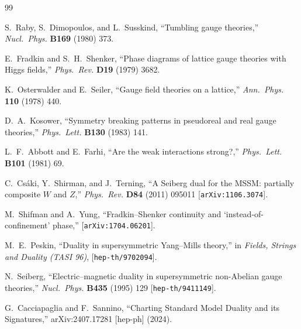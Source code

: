 \documentclass[11pt,a4paper]{article}
\begin{document}
\begin{thebibliography}{99}

  S.~Raby, S.~Dimopoulos, and L.~Susskind,
  ``Tumbling gauge theories,''
  \textit{Nucl.~Phys.} \textbf{B169} (1980) 373.

  E.~Fradkin and S.~H.~Shenker,
  ``Phase diagrams of lattice gauge theories with Higgs fields,''
  \textit{Phys.~Rev.} \textbf{D19} (1979) 3682.

  K.~Osterwalder and E.~Seiler,
  ``Gauge field theories on a lattice,''
  \textit{Ann.~Phys.} \textbf{110} (1978) 440.

  D.~A.~Kosower,
  ``Symmetry breaking patterns in pseudoreal and real gauge theories,''
  \textit{Phys.~Lett.} \textbf{B130} (1983) 141.

  L.~F.~Abbott and E.~Farhi,
  ``Are the weak interactions strong?,''
  \textit{Phys.~Lett.} \textbf{B101} (1981) 69.

  C.~Cs\'aki, Y.~Shirman, and J.~Terning,
  ``A Seiberg dual for the MSSM: partially composite $W$ and $Z$,''
  \textit{Phys.~Rev.} \textbf{D84} (2011) 095011
  [\texttt{arXiv:1106.3074}].

  M.~Shifman and A.~Yung,
  ``Fradkin--Shenker continuity and `instead-of-confinement' phase,''
  [\texttt{arXiv:1704.06201}].

  M.~E.~Peskin,
  ``Duality in supersymmetric Yang--Mills theory,''
  in \textit{Fields, Strings and Duality (TASI 96)},
  [\texttt{hep-th/9702094}].

  N.~Seiberg,
  ``Electric--magnetic duality in supersymmetric non-Abelian gauge
  theories,''
  \textit{Nucl.~Phys.} \textbf{B435} (1995) 129
  [\texttt{hep-th/9411149}].

  G.~Cacciapaglia and F.~Sannino,
  ``Charting Standard Model Duality and its Signatures,''
  arXiv:2407.17281 [hep-ph] (2024).

\end{thebibliography}
\end{document}
